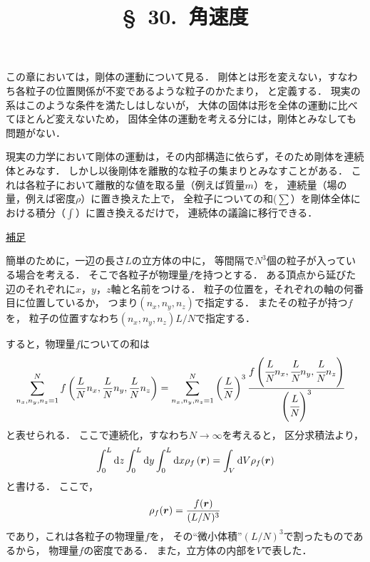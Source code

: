 \documentclass[a4paper]{jsarticle}
\title{\S\ 30.\ 角速度}
\def\vec#1{\mbox{\boldmath $#1$}}
\newcommand{\ddif}{{\rm d}}
\begin{document}
\maketitle

この章においては，剛体の運動について見る．
剛体とは形を変えない，すなわち各粒子の位置関係が不変であるような粒子のかたまり，
と定義する．
現実の系はこのような条件を満たしはしないが，
大体の固体は形を全体の運動に比べてほとんど変えないため，
固体全体の運動を考える分には，剛体とみなしても問題がない．

現実の力学において剛体の運動は，その内部構造に依らず，そのため剛体を連続体とみなす．
しかし以後剛体を離散的な粒子の集まりとみなすことがある．
これは各粒子において離散的な値を取る量（例えば質量$m$）を，
連続量（場の量，例えば密度$\rho$）に置き換えた上で，
全粒子についての和($\sum$）を剛体全体における積分（$\int$）に置き換えるだけで，
連続体の議論に移行できる．
\begin{screen}
	\underline{補足}

	簡単のために，一辺の長さ$L$の立方体の中に，
	等間隔で$N^3$個の粒子が入っている場合を考える．
	そこで各粒子が物理量$f$を持つとする．
	ある頂点から延びた辺のそれぞれに$x$，$y$，$z$軸と名前をつける．
	粒子の位置を，それぞれの軸の何番目に位置しているか，
	つまり$(n_x, n_y, n_z)$で指定する．
	またその粒子が持つ$f$を，
	粒子の位置すなわち$(n_x, n_y, n_z)L/N$で指定する．

	すると，物理量$f$についての和は
	\begin{align}
		\sum_{n_x, n_y, n_z = 1}^N f \left(
			\frac{L}{N}n_x, \frac{L}{N}n_y, \frac{L}{N}n_z
		\right)
		&= \sum_{n_x, n_y, n_z = 1}^N
		\left( \frac{L}{N} \right)^3
		\cfrac{f\left(
			\cfrac{L}{N}n_x, \cfrac{L}{N}n_y, \cfrac{L}{N}n_z
		\right)}
		{\left( \cfrac{L}{N} \right)^3}
	\end{align}
	と表せられる．
	ここで連続化，すなわち$N \rightarrow \infty$を考えると，
	区分求積法より，
	\begin{align}
		\int_{0}^{L} \ddif z \int_{0}^{L} \ddif y \int_{0}^{L} \ddif x
		\rho_f \left( \vec{r} \right)
		= \int_{V} \ddif V \rho_f (\vec{r})
	\end{align}
	と書ける．
	ここで，
	\begin{align}
		\rho_f ( \vec{r} ) = \frac{f(\vec{r})}{(L/N)^3}
	\end{align}
	であり，これは各粒子の物理量$f$を，
	その``微小体積''$(L/N)^3$で割ったものであるから，
	物理量$f$の密度である．
	また，立方体の内部を$V$で表した．
\end{screen}
\end{document}
